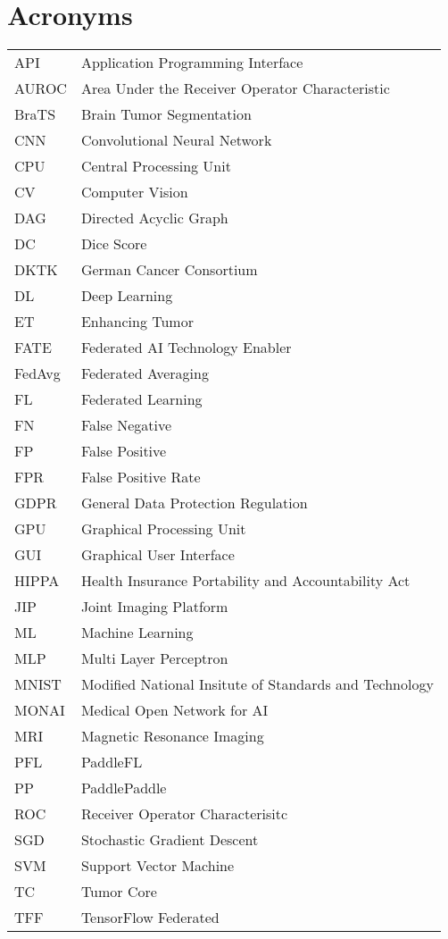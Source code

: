 \section*{Acronyms}
\begin{table}[H]
    \begin{tabular}{p{4cm} p{10cm}}
     API    & Application Programming Interface \\
     AUROC  & Area Under the Receiver Operator Characteristic \\
     BraTS  & Brain Tumor Segmentation \\
     CNN    & Convolutional Neural Network \\
     CPU    & Central Processing Unit \\
     CV     & Computer Vision \\
     DAG    & Directed Acyclic Graph \\
     DC     & Dice Score \\
     DKTK   & German Cancer Consortium \\
     DL     & Deep Learning \\
     ET     & Enhancing Tumor \\
     FATE   & Federated AI Technology Enabler \\
     FedAvg & Federated Averaging \\
     FL     & Federated Learning \\
     FN     & False Negative \\
     FP     & False Positive \\
     FPR    & False Positive Rate \\
     GDPR   & General Data Protection Regulation \\
     GPU    & Graphical Processing Unit \\
     GUI    & Graphical User Interface \\
     HIPPA  & Health Insurance Portability and Accountability Act \\
     JIP    & Joint Imaging Platform \\
     ML     & Machine Learning \\
     MLP    & Multi Layer Perceptron \\
     MNIST  & Modified National Insitute of Standards and Technology \\
     MONAI  & Medical Open Network for AI \\
     MRI    & Magnetic Resonance Imaging \\
     PFL    & PaddleFL \\
     PP     & PaddlePaddle \\
     ROC    & Receiver Operator Characterisitc \\
     SGD    & Stochastic Gradient Descent \\
     SVM    & Support Vector Machine \\
     TC     & Tumor Core \\
     TFF    & TensorFlow Federated \\
    \end{tabular}%
\end{table}%

